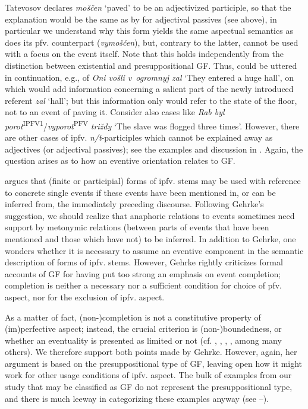 \documentclass[output=paper]{langscibook}
\begin{document}
\noindent Tatevosov declares \textit{moščen} `paved' to be an adjectivized participle, so that the explanation would be the same as by \citet{Borik.Gehrke2018} for adjectival passives (see above), in particular we understand why this form yields the same aspectual semantics as does its pfv. counterpart (\textit{vymoščen}), but, contrary to the latter, cannot be used with a focus on the event itself. Note that this holds independently from the distinction between existential and presuppositional GF. Thus,  could be uttered in continuation, e.g., of \textit{Oni vošli v~ogromnyj zal} ‘They entered a huge hall’, on which  would add information concerning a salient part of the newly introduced referent \textit{zal} ‘hall’; but this information only would refer to the state of the floor, not to an event of paving it. Consider also cases like \textit{Rab byl porot}\textsuperscript{IPFV1}\slash\textit{vyporot}\textsuperscript{PFV} \textit{triždy} ‘The slave was flogged three times’. However, there are other cases of ipfv. \textit{n/t}-participles which cannot be explained away as adjectives (or adjectival passives); see the examples and discussion in . Again, the question arises as to how an eventive orientation relates to GF.

 argues that (finite or participial) forms of ipfv. stems may be used with reference to concrete single events if these events have been mentioned in, or can be inferred from, the immediately preceding discourse. Following Gehrke's suggestion, we should realize that anaphoric relations to events sometimes need support by metonymic relations (between parts of events that have been mentioned and those which have not) to be inferred. In addition to Gehrke, one wonders whether it is necessary to assume an eventive component in the semantic description of forms of ipfv. stems. However, Gehrke rightly criticizes formal accounts of GF for having put too strong an emphasis on event completion; completion is neither a necessary nor a sufficient condition for choice of pfv. aspect, nor for the exclusion of ipfv. aspect. 

As a matter of fact, (non-)completion is not a constitutive property of (im)per\-fec\-tive aspect; instead, the crucial criterion is (non-)boundedness, or whether an eventuality is presented as limited or not (cf. \citealt{Lehmann1999}, \citealt{Wiemer2017}, \citealt{Wiemer.Seržant2017}, \citealt{Breu2021}, among many others). We therefore support both points made by Gehrke. However, again, her argument is based on the presuppositional type of GF, leaving open how it might work for other usage conditions of ipfv. aspect. The bulk of examples from our study that may be classified as GF do not represent the presuppositional type, and there is much leeway in categorizing these examples anyway (see --).
\end{document}
